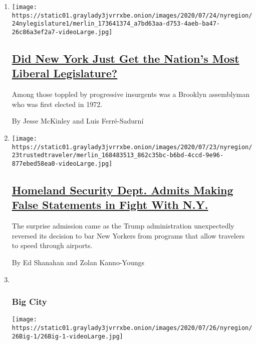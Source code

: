 \begin{enumerate}
\def\labelenumi{\arabic{enumi}.}
\item
  \texttt{[image: https://static01.graylady3jvrrxbe.onion/images/2020/07/24/nyregion/24nylegislature1/merlin\_173641374\_a7bd63aa-d753-4aeb-ba47-26c86a3ef2a7-videoLarge.jpg]}

  \hypertarget{did-new-york-just-get-the-nations-most-liberal-legislature}{%
  \subsection{\texorpdfstring{\href{/2020/07/24/nyregion/progressive-primaries-ny-legislature.html}{Did
  New York Just Get the Nation's Most Liberal
  Legislature?}}{Did New York Just Get the Nation's Most Liberal Legislature?}}\label{did-new-york-just-get-the-nations-most-liberal-legislature}}

  Among those toppled by progressive insurgents was a Brooklyn
  assemblyman who was first elected in 1972.

  By Jesse McKinley and Luis Ferré-Sadurní
\item
  \texttt{[image: https://static01.graylady3jvrrxbe.onion/images/2020/07/23/nyregion/23trustedtraveler/merlin\_168483513\_862c35bc-b6bd-4ccd-9e96-877ebed58ea0-videoLarge.jpg]}

  \hypertarget{homeland-security-dept-admits-making-false-statements-in-fight-with-ny}{%
  \subsection{\texorpdfstring{\href{/2020/07/23/nyregion/trusted-traveler-homeland-security.html}{Homeland
  Security Dept. Admits Making False Statements in Fight With
  N.Y.}}{Homeland Security Dept. Admits Making False Statements in Fight With N.Y.}}\label{homeland-security-dept-admits-making-false-statements-in-fight-with-ny}}

  The surprise admission came as the Trump administration unexpectedly
  reversed its decision to bar New Yorkers from programs that allow
  travelers to speed through airports.

  By Ed Shanahan and Zolan Kanno-Youngs
\item ~
  \hypertarget{big-city}{%
  \subsubsection{Big City}\label{big-city}}

  \texttt{[image: https://static01.graylady3jvrrxbe.onion/images/2020/07/26/nyregion/26Big-1/26Big-1-videoLarge.jpg]}


\end{enumerate}
